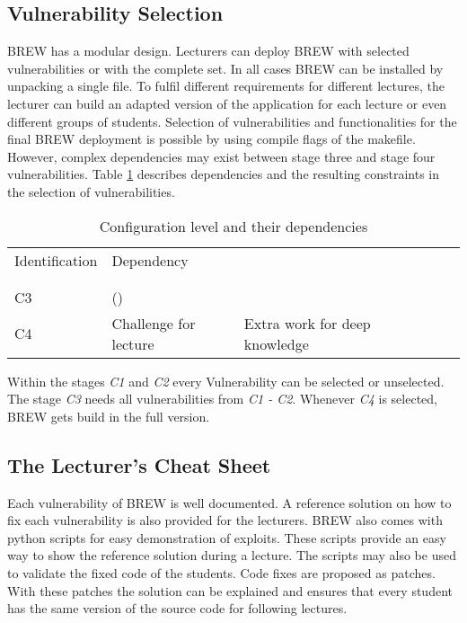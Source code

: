 \documentclass{llncs}
\begin{document}
\subsection{Vulnerability Selection}
BREW has a modular design.
Lecturers can deploy BREW with selected vulnerabilities or with the complete set.
In all cases BREW can be installed by unpacking a single file.
To fulfil different requirements for different lectures, the lecturer can build an adapted version of the application for each lecture or even different groups of students.
Selection of vulnerabilities and functionalities for the final BREW deployment is possible by using compile flags of the makefile.
However, complex dependencies may exist between stage three and stage four vulnerabilities.
Table \ref{tab:conflevel} describes dependencies and the resulting constraints in the selection of vulnerabilities.

\begin{table}
\centering
\caption{Configuration level and their dependencies}
\label{tab:conflevel}
\begin{tabular}{llllll}
\hline\noalign{\smallskip}
Identification & Dependency\\
\noalign{\smallskip}
\hline
\noalign{\smallskip}
 & \\
 & \\
C3 & ()\\
C4 & Challenge for lecture & Extra work for deep knowledge\\
\hline
\end{tabular}
\end{table}
Within the stages {\em C1} and {\em C2} every Vulnerability can be selected or unselected. The stage {\em C3} needs all vulnerabilities from {\em C1 - C2}. Whenever {\em C4} is selected, BREW gets build in the full version.

\subsection{The Lecturer's Cheat Sheet}
Each vulnerability of BREW is well documented. A reference solution on how to fix each vulnerability is also provided for the lecturers. BREW also comes with python scripts for easy demonstration of exploits. These scripts provide an easy way to show the reference solution during a lecture. The scripts may also be used to validate the fixed code of the students. Code fixes are proposed as patches. With these patches the solution can be explained and ensures that every student has the same version of the source code for following lectures.
\end{document}
